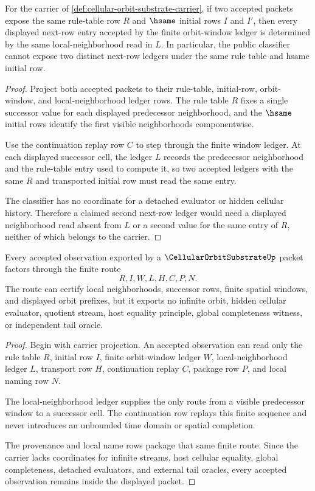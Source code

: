 \begin{theorem}
\label{thm:cellular-orbit-substrate-local-determinacy}
For the carrier of \autoref{def:cellular-orbit-substrate-carrier}, if two accepted packets expose the same rule-table row $R$ and $\hsame$ initial rows $I$ and $I'$, then every displayed next-row entry accepted by the finite orbit-window ledger is determined by the same local-neighborhood read in $L$. In particular, the public classifier cannot expose two distinct next-row ledgers under the same rule table and hsame initial row.
\end{theorem}
\begin{proof}
Project both accepted packets to their rule-table, initial-row, orbit-window, and local-neighborhood ledger rows. The rule table $R$ fixes a single successor value for each displayed predecessor neighborhood, and the $\hsame$ initial rows identify the first visible neighborhoods componentwise.

Use the continuation replay row $C$ to step through the finite window ledger. At each displayed successor cell, the ledger $L$ records the predecessor neighborhood and the rule-table entry used to compute it, so two accepted ledgers with the same $R$ and transported initial row must read the same entry.

The classifier has no coordinate for a detached evaluator or hidden cellular history. Therefore a claimed second next-row ledger would need a displayed neighborhood read absent from $L$ or a second value for the same entry of $R$, neither of which belongs to the carrier.
\end{proof}

\begin{theorem}
\label{thm:cellular-orbit-substrate-observation-nonescape}
Every accepted observation exported by a $\CellularOrbitSubstrateUp$ packet factors through the finite route
$$
R,I,W,L,H,C,P,N .
$$
The route can certify local neighborhoods, successor rows, finite spatial windows, and displayed orbit prefixes, but it exports no infinite orbit, hidden cellular evaluator, quotient stream, host equality principle, global completeness witness, or independent tail oracle.
\end{theorem}
\begin{proof}
Begin with carrier projection. An accepted observation can read only the rule table $R$, initial row $I$, finite orbit-window ledger $W$, local-neighborhood ledger $L$, transport row $H$, continuation replay $C$, package row $P$, and local naming row $N$.

The local-neighborhood ledger supplies the only route from a visible predecessor window to a successor cell. The continuation row replays this finite sequence and never introduces an unbounded time domain or spatial completion.

The provenance and local name rows package that same finite route. Since the carrier lacks coordinates for infinite streams, host cellular equality, global completeness, detached evaluators, and external tail oracles, every accepted observation remains inside the displayed packet.
\end{proof}

